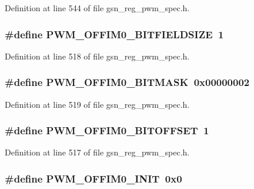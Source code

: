 Definition at line 544 of file gsn\_\-reg\_\-pwm\_\-spec.h.

\hypertarget{a00565_a1553c8ebc3a22a8b7a9443c95c3a9a28}{
\subsubsection[{PWM\_\-OFFIM0\_\-BITFIELDSIZE}]{\setlength{\rightskip}{0pt plus 5cm}\#define PWM\_\-OFFIM0\_\-BITFIELDSIZE~1}}
\label{a00565_a1553c8ebc3a22a8b7a9443c95c3a9a28}


Definition at line 518 of file gsn\_\-reg\_\-pwm\_\-spec.h.

\hypertarget{a00565_a01e614a0416e13e6f17f18e0bef689ed}{
\subsubsection[{PWM\_\-OFFIM0\_\-BITMASK}]{\setlength{\rightskip}{0pt plus 5cm}\#define PWM\_\-OFFIM0\_\-BITMASK~0x00000002}}
\label{a00565_a01e614a0416e13e6f17f18e0bef689ed}


Definition at line 519 of file gsn\_\-reg\_\-pwm\_\-spec.h.

\hypertarget{a00565_ab1bbe80c83ff0aa3014c4aa9e442a13f}{
\subsubsection[{PWM\_\-OFFIM0\_\-BITOFFSET}]{\setlength{\rightskip}{0pt plus 5cm}\#define PWM\_\-OFFIM0\_\-BITOFFSET~1}}
\label{a00565_ab1bbe80c83ff0aa3014c4aa9e442a13f}


Definition at line 517 of file gsn\_\-reg\_\-pwm\_\-spec.h.

\hypertarget{a00565_a9f78151961be85de838922f5fbd3d5e1}{
\subsubsection[{PWM\_\-OFFIM0\_\-INIT}]{\setlength{\rightskip}{0pt plus 5cm}\#define PWM\_\-OFFIM0\_\-INIT~0x0}}
\label{a00565_a9f78151961be85de838922f5fbd3d5e1}


